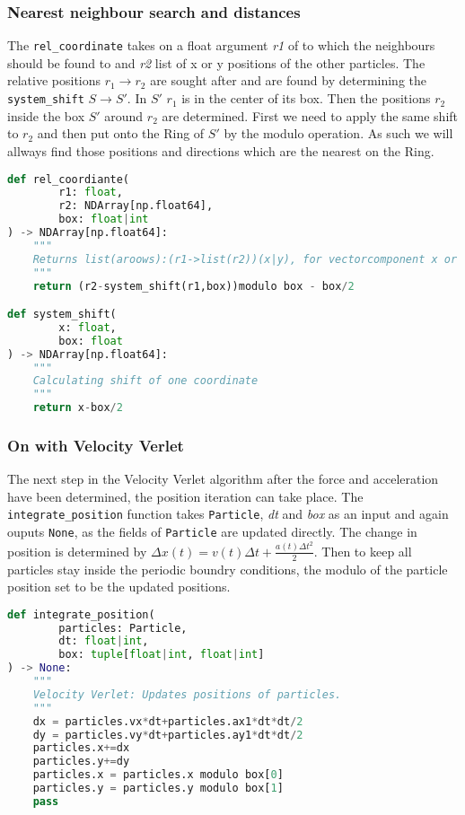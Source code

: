 \documentclass{article}
\begin{document}
\subsubsection{Nearest neighbour search and distances}
The \texttt{rel_coordinate} takes on a float argument \textit{r1} of to which the neighbours should be found to and \textit{r2} list of x or y positions of the other particles. The relative positions $r_1\to r_2$ are sought after and are found by determining the \texttt{system_shift} $S\to S'$. In $S'$ $r_1$ is in the center of its box. Then the positions $r_2$ inside the box $S'$ around $r_2$ are determined. First we need to apply the same shift to $r_2$ and then put onto the Ring of $S'$ by the modulo operation. As such we will allways find those positions and directions which are the nearest on the Ring.

\begin{lstlisting}[language=Python, caption= Nearest neighbour search in relative coordinates]
def rel_coordiante(
        r1: float,
        r2: NDArray[np.float64],
        box: float|int
) -> NDArray[np.float64]:  
    """ 
    Returns list(aroows):(r1->list(r2))(x|y), for vectorcomponent x or y.
    """
    return (r2-system_shift(r1,box))modulo box - box/2

def system_shift(
        x: float,
        box: float
) -> NDArray[np.float64]:
    """
    Calculating shift of one coordinate
    """
    return x-box/2   
\end{lstlisting}

\subsubsection{On with Velocity Verlet}
The next step in the Velocity Verlet algorithm after the force and acceleration have been determined, the position iteration can take place. The \texttt{integrate_position} function takes \texttt{Particle}, \textit{dt} and \textit{box} as an input and again ouputs \texttt{None}, as the fields of \texttt{Particle} are updated directly. The change in position is determined by $\Delta x(t)=v(t)\Delta t+\frac{a(t)\Delta t^2}{2}$. Then to keep all particles stay inside the periodic boundry conditions, the modulo of the particle position set to be the updated positions. 

\begin{lstlisting}[language=Python, caption=integrate position]
def integrate_position(
        particles: Particle,
        dt: float|int,
        box: tuple[float|int, float|int]
) -> None:
    """
    Velocity Verlet: Updates positions of particles.
    """
    dx = particles.vx*dt+particles.ax1*dt*dt/2
    dy = particles.vy*dt+particles.ay1*dt*dt/2
    particles.x+=dx 
    particles.y+=dy
    particles.x = particles.x modulo box[0]
    particles.y = particles.y modulo box[1]
    pass
\end{lstlisting}
\end{document}
